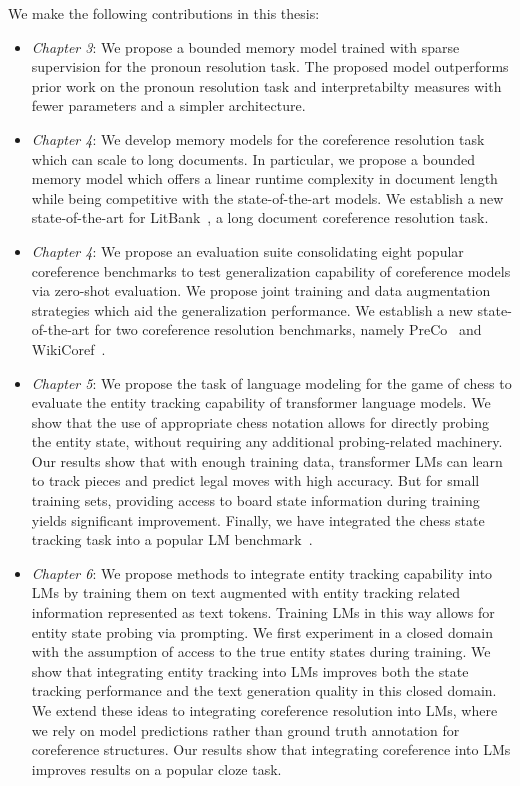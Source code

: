 \documentclass[12pt]{thesis-umich}[thesis]
\begin{document}
We make the following contributions in this thesis:
\begin{itemize}
    \item \textit{Chapter 3}: We propose a bounded memory model trained with sparse supervision for the pronoun resolution task. 
    The proposed model outperforms prior work on the pronoun resolution task and interpretabilty measures with fewer parameters and a simpler architecture. 
    \item \textit{Chapter 4}: We develop memory models for the coreference resolution task which can scale to long documents. In particular, we propose a bounded memory model which offers a linear runtime complexity in document length while being competitive with the state-of-the-art models. We establish a new state-of-the-art for LitBank~\cite{bamman2019annotated}, a long document coreference resolution task.
    \item \textit{Chapter 4}: We propose an evaluation suite consolidating eight popular coreference benchmarks to test generalization capability of coreference models via zero-shot evaluation. 
    We propose joint training and data augmentation strategies which aid the generalization performance. 
    We establish a new state-of-the-art for two coreference resolution benchmarks, namely PreCo~\cite{chen-etal-2018-preco} and WikiCoref~\cite{ghaddar-langlais-2016-wikicoref}.
    \item \textit{Chapter 5}: We propose the task of language modeling for the game of chess to evaluate the entity tracking capability of transformer language models. 
    We show that the use of appropriate chess notation allows for directly probing the entity state, without requiring any additional probing-related machinery. 
    Our results show that with enough training data, transformer LMs can learn to track pieces and predict legal moves with high accuracy. But for small training sets, providing access to board state information during training  yields significant improvement. 
    Finally, we have integrated the chess state tracking task into a popular LM benchmark~\cite{bigbench2022}.
    \item  \textit{Chapter 6}: We propose methods to integrate entity tracking capability into LMs by training them on text augmented with entity tracking related information represented as text tokens.  
    Training LMs in this way allows for entity state probing via prompting. 
    We first experiment in a closed domain with the assumption of access to the true entity states during training. 
    We show that integrating entity tracking into LMs improves both the state tracking performance and the text generation quality in this closed domain. 
    We extend these ideas to integrating coreference resolution into LMs, where we rely on model predictions rather than ground truth annotation for coreference structures. 
    Our results show that integrating coreference into LMs improves results on a popular cloze task.
    

    
\end{itemize}
\end{document}
